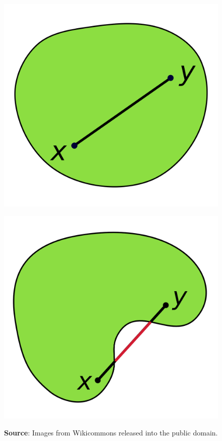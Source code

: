 \begin{figure}[h]
	\centering
	\begin{minipage}[h]{0.2\textwidth}
		\includegraphics[width=1\textwidth]{import/ConvexPoly}
		\label{fig:ConvexPoly}
	\end{minipage}
	\hspace{1cm}
	\begin{minipage}[h]{0.2\textwidth}
		\includegraphics[width=1\textwidth]{import/ConcavePoly}
		\label{fig:ConcavePoly}
	\end{minipage}
	\caption{\textbf{Source}: Images from Wikicommons released into the public domain.}
\end{figure}

